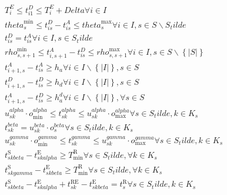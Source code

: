 \begin{align}
  & T_{i}^{E} \leq t_{i 1}^{D} \leq T_{i}^{E} + \mathit{Delta} \forall i \in I \tag{eq\_0001} \\
  & \mathit{theta}_{s}^{\text{min}} \leq t_{\mathit{is}}^{D} - t_{\mathit{is}}^{A} \leq \mathit{theta}_{s}^{\text{max}} \forall i \in I , s \in S \backslash S_tilde \tag{eq\_0002} \\
  & t_{\mathit{is}}^{D} = t_{\mathit{is}}^{A} \forall i \in I , s \in S_tilde \tag{eq\_0003} \\
  & \mathit{rho}_{s , s + 1}^{\text{min}} \leq t_{i , s + 1}^{A} - t_{\mathit{is}}^{D} \leq \mathit{rho}_{s , s + 1}^{\text{max}} \forall i \in I , s \in S \backslash \left\{\left|S\right|\right\} \tag{eq\_0004} \\
  & t_{i + 1 , s}^{A} - t_{\mathit{is}}^{A} \geq h_{a} \forall i \in I \backslash \left\{\left|I\right|\right\} , s \in S \tag{eq\_0005} \\
  & t_{i + 1 , s}^{D} - t_{\mathit{is}}^{D} \geq h_{d} \forall i \in I \backslash \left\{\left|I\right|\right\} , s \in S \tag{eq\_0006} \\
  & t_{i + 1 , s}^{A} - t_{\mathit{is}}^{D} \geq h_{a}^{d} \forall i \in I \backslash \left\{\left|I\right|\right\} , \forall s \in S \tag{eq\_0007} \\
  & u_{\mathit{sk}}^{\mathit{alpha}} \cdot o_{\text{min}}^{\mathit{alpha}} \leq t_{\mathit{sk}}^{\mathit{alpha}} \leq u_{\mathit{sk}}^{\mathit{alpha}} \cdot o_{\text{max}}^{\mathit{alpha}} \forall s \in S_tilde , k \in K_{s} \tag{eq\_0008} \\
  & t_{\mathit{sk}}^{\mathit{beta}} = u_{\mathit{sk}}^{\mathit{beta}} \cdot o_{s}^{\mathit{beta}} \forall s \in S_tilde , k \in K_{s} \tag{eq\_0009} \\
  & u_{\mathit{sk}}^{\mathit{gamma}} \cdot o_{\text{min}}^{\mathit{gamma}} \leq t_{\mathit{sk}}^{\mathit{gamma}} \leq u_{\mathit{sk}}^{\mathit{gamma}} \cdot o_{\text{max}}^{\mathit{gamma}} \forall s \in S_tilde , k \in K_{s} \tag{eq\_0010} \\
  & t_{\mathit{sk} \mathit{beta}}^{\text{S}} - t_{\mathit{sk} \mathit{alpha}}^{\text{E}} \geq T_{\text{min}}^{\text{R}} \forall s \in S_tilde , \forall k \in K_{s} \tag{eq\_0011} \\
  & t_{\mathit{sk} \mathit{gamma}}^{\text{S}} - t_{\mathit{sk} \mathit{beta}}^{\text{E}} \geq T_{\text{min}}^{\text{R}} \forall s \in S_tilde , \forall k \in K_{s} \tag{eq\_0012} \\
  & t_{\mathit{sk} \mathit{beta}}^{\text{S}} - t_{\mathit{sk} \mathit{alpha}}^{\text{E}} + t_{\mathit{sk}}^{\text{RE}} - t_{\mathit{sk} \mathit{beta}}^{\text{E}} = t_{s}^{\text{R}} \forall s \in S_tilde , k \in K_{s} \tag{eq\_0013} \\

\end{align}
